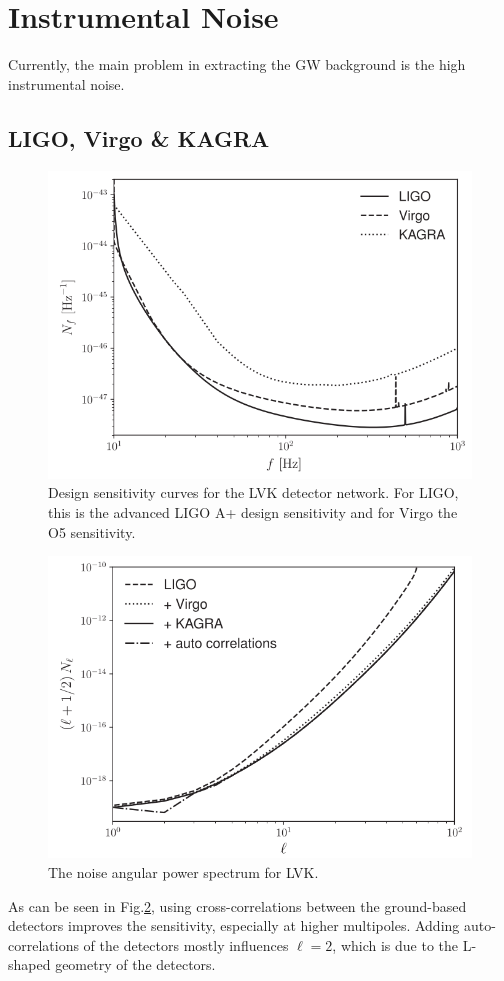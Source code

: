 \section{Instrumental Noise}
Currently, the main problem in extracting the GW background is the high instrumental noise.
\subsection{LIGO, Virgo \& KAGRA}

\begin{figure}[h]
    \centering
    \includegraphics[width=0.7\linewidth]{Images/lvk_frequency_noise.png}
    \caption{Design sensitivity curves for the LVK detector network. For LIGO, this is the advanced LIGO A+ design sensitivity and for Virgo the O5 sensitivity.}
    \label{lvk_sensitivity}
\end{figure} 

\begin{figure}[h]
    \centering
    \includegraphics[width=0.7\linewidth]{Images/alonso_ligo_noise.png}
    \caption{The noise angular power spectrum for LVK.}
    \label{lvk_Cl}
\end{figure} 

As can be seen in Fig.\ref{lvk_Cl}, using cross-correlations between the ground-based detectors improves the sensitivity, especially at higher multipoles. Adding auto-correlations of the detectors mostly influences $\ell=2$, which is due to the L-shaped geometry of the detectors. 

